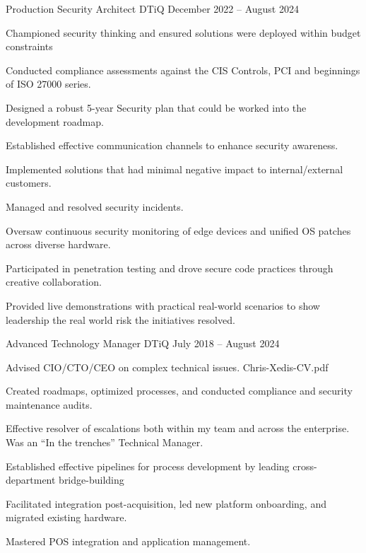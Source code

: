 \documentclass[]{resume-format}
\begin{document}
\begin{cventries}
    \cventry
    { Production Security Architect }
    { DTiQ }
    {}
    { December 2022 – August 2024 }
    {\begin{cvitems}
        \item { Championed security thinking and ensured solutions were deployed within budget constraints }
        \item { Conducted compliance assessments against the CIS Controls, PCI and beginnings of ISO 27000 series. }
        \item { Designed a robust 5-year Security plan that could be worked into the development roadmap. }
        \item { Established effective communication channels to enhance security awareness. }
        \item { Implemented solutions that had minimal negative impact to internal/external customers. }
        \item { Managed and resolved security incidents. }
        \item { Oversaw continuous security monitoring of edge devices and unified OS patches across diverse hardware. }
        \item { Participated in penetration testing and drove secure code practices through creative collaboration. }
        \item { Provided live demonstrations with practical real-world scenarios to show leadership the real world risk the initiatives resolved. }
    \end{cvitems}}
    \cventry
    { Advanced Technology Manager }
    { DTiQ }
    {}
    { July 2018 – August 2024 }
    {\begin{cvitems}
        \item { Advised CIO/CTO/CEO on complex technical issues. }Chris-Xedis-CV.pdf
        \item { Created roadmaps, optimized processes, and conducted compliance and security maintenance audits. }
        \item { Effective resolver of escalations both within my team and across the enterprise. Was an “In the trenches” Technical Manager. }
        \item { Established effective pipelines for process development by leading cross-department bridge-building }
        \item { Facilitated integration post-acquisition, led new platform onboarding, and migrated existing hardware. }
        \item { Mastered POS integration and application management. }

\end{cvitems}}
\end{cventries}
\end{document}
